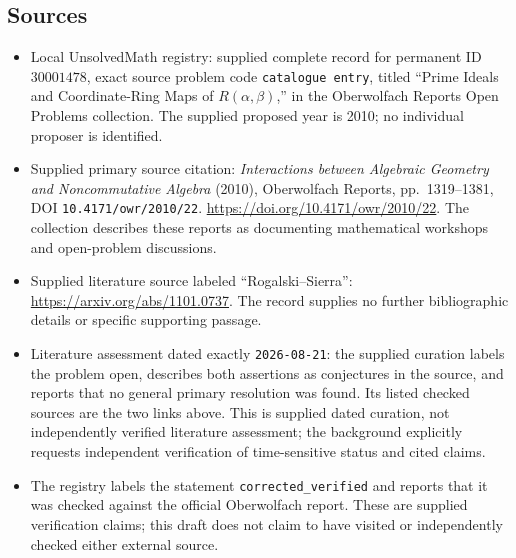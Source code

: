 \documentclass[11pt]{article}
\begin{document}
\subsection{Sources}
\begin{itemize}
\item Local UnsolvedMath registry: supplied complete record for permanent ID \(30001478\), exact source problem code \texttt{catalogue entry}, titled ``Prime Ideals and Coordinate-Ring Maps of \(R(\alpha,\beta)\),'' in the Oberwolfach Reports Open Problems collection. The supplied proposed year is 2010; no individual proposer is identified.
\item Supplied primary source citation: \emph{Interactions between Algebraic Geometry and Noncommutative Algebra} (2010), Oberwolfach Reports, pp.\ 1319--1381, DOI \texttt{10.4171/owr/2010/22}. \url{https://doi.org/10.4171/owr/2010/22}. The collection describes these reports as documenting mathematical workshops and open-problem discussions.
\item Supplied literature source labeled ``Rogalski--Sierra'': \url{https://arxiv.org/abs/1101.0737}. The record supplies no further bibliographic details or specific supporting passage.
\item Literature assessment dated exactly \texttt{2026-08-21}: the supplied curation labels the problem open, describes both assertions as conjectures in the source, and reports that no general primary resolution was found. Its listed checked sources are the two links above. This is supplied dated curation, not independently verified literature assessment; the background explicitly requests independent verification of time-sensitive status and cited claims.
\item The registry labels the statement \texttt{corrected\_verified} and reports that it was checked against the official Oberwolfach report. These are supplied verification claims; this draft does not claim to have visited or independently checked either external source.
\end{itemize}
\end{document}
